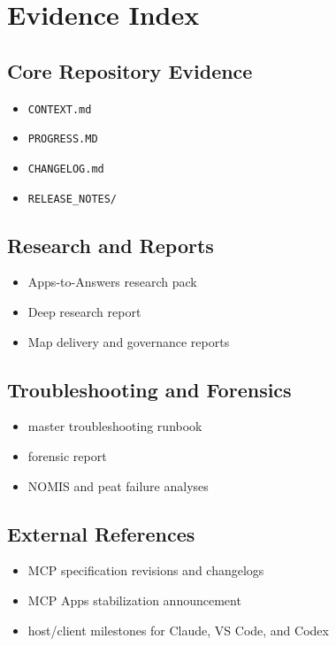 \chapter{Evidence Index}
\label{ch:evidence}

\section{Core Repository Evidence}

\begin{itemize}
  \item \texttt{CONTEXT.md}
  \item \texttt{PROGRESS.MD}
  \item \texttt{CHANGELOG.md}
  \item \texttt{RELEASE\_NOTES/}
\end{itemize}

\section{Research and Reports}

\begin{itemize}
  \item Apps-to-Answers research pack \cite{apps_to_answers_brief}
  \item Deep research report \cite{deep_research_report}
  \item Map delivery and governance reports \cite{map_delivery_plan,safe_by_design_report}
\end{itemize}

\section{Troubleshooting and Forensics}

\begin{itemize}
  \item master troubleshooting runbook \cite{troubleshooting_master}
  \item forensic report \cite{forensic_report}
  \item NOMIS and peat failure analyses \cite{nomis_deep_analysis,peat_failure_chain}
\end{itemize}

\section{External References}

\begin{itemize}
  \item MCP specification revisions and changelogs \cite{mcp_20250326_changelog,mcp_20251125_changelog,mcp_20250618_spec}
  \item MCP Apps stabilization announcement \cite{mcp_updates_blog}
  \item host/client milestones for Claude, VS Code, and Codex \cite{anthropic_claude_code,anthropic_remote_mcp,vscode_199,openai_codex_intro,openai_codex_app}
\end{itemize}
